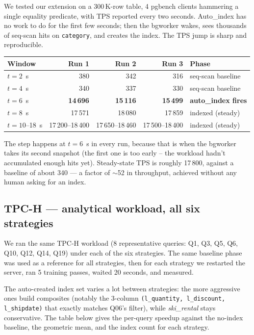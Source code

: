 \documentclass[10pt,a4paper]{article}
\newcommand{\code}[1]{\texttt{\small #1}}
\begin{document}
We tested our extension on a 300\,K-row table, 4 pgbench clients
hammering a single equality predicate, with TPS reported every two
seconds. Auto\_index has no work to do for the first few seconds;
then the bgworker wakes, sees thousands of seq-scan hits on
\code{category}, and creates the index. The TPS jump is sharp and
reproducible.

\begin{table}[h]
\centering\small
\begin{tabular}{lrrrl}
\toprule
\textbf{Window} & \textbf{Run 1} & \textbf{Run 2} & \textbf{Run 3} & \textbf{Phase} \\
\midrule
$t=2$~s        & 380     & 342     & 316     & seq-scan baseline \\
$t=4$~s        & 340     & 337     & 330     & seq-scan baseline \\
$t=6$~s        & \textbf{14\,696} & \textbf{15\,116} & \textbf{15\,499} & \textbf{auto\_index fires} \\
$t=8$~s        & 17\,571 & 18\,080 & 17\,859 & indexed (steady) \\
$t=10$--18~s   & 17\,200--18\,400 & 17\,650--18\,460 & 17\,500--18\,400 & indexed (steady) \\
\bottomrule
\end{tabular}
\end{table}

The step happens at $t=6$~s in every run, because that is when the
bgworker takes its second snapshot (the first one is too early --
the workload hadn't accumulated enough hits yet). Steady-state TPS
is roughly 17\,800, against a baseline of about 340 --- a factor of
$\sim$52 in throughput, achieved without any human asking for an
index.

\subsection*{TPC-H --- analytical workload, all six strategies}

We ran the same
TPC-H workload (8 representative queries: Q1, Q3, Q5, Q6, Q10, Q12,
Q14, Q19) under each of the six strategies. The same baseline phase
was used as a reference for all strategies, then for each strategy
we restarted the server, ran 5 training passes, waited 20 seconds,
and measured.

The auto-created index set varies a lot between strategies: the more
aggressive ones build composites (notably the 3-column
\code{(l\_quantity, l\_discount, l\_shipdate)} that exactly matches
Q06's filter), while \emph{ski\_rental} stays conservative. The
table below gives the per-query speedup against the no-index
baseline, the geometric mean, and the index count for each
strategy.
\end{document}
